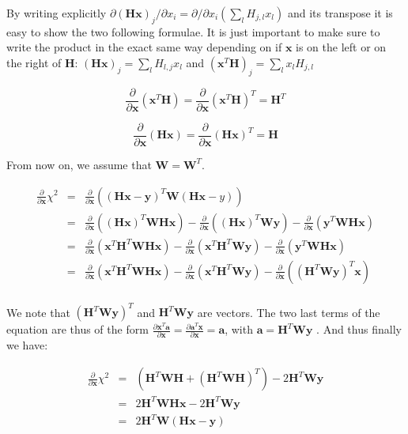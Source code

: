 \documentclass[12pt]{article}
\newcommand{\psf}{\mathbf{H}}
\newcommand{\x}{\mathbf{x}}
\newcommand{\y}{\mathbf{y}}
\newcommand{\W}{\mathbf{W}}
\newcommand{\ddx}{\frac{\partial}{\partial \mathbf{x}}}
\begin{document}
By writing explicitly $\partial (\psf \x)_{j} / \partial x_{i}
= \partial/\partial x_{i} \left( \sum_{l} H_{j,l} x_{l}\right)$ and its transpose
it is easy to show the two following formulae. It is just important to make sure
to write the product in the exact same way depending on if $\x$ is on the left
or on the right of $\psf$: $\left( \psf \x \right)_{j} =  \sum_{l} H_{l,j} x_{l}$
and $\left( \x^{T} \psf \right)_{j} =  \sum_{l} x_{l} H_{j,l}$

\begin{equation}
  \label{eq:3}
  \ddx \left( \x^{T} \psf \right) = \ddx \left( \x^{T} \psf \right)^{T} = \psf^{T}
\end{equation}

\begin{equation}
  \label{eq:4}
  \ddx \left( \psf \x \right) =  \ddx \left( \psf \x \right)^{T} = \psf
\end{equation}



From now on, we assume that $\W = \W^{T}$.

\begin{eqnarray*}
  \label{eq:5}
  \ddx \chi^{2} & = & \ddx \left( (\psf \x - \y)^{T} \W (\psf \x - y) \right)\\
                & = & \ddx \left( (\psf \x)^{T} \W \psf \x \right)  
                    - \ddx \left( (\psf \x)^{T} \W \y \right)
                    - \ddx \left( \y^{T} \W \psf \x \right) \\
                & = & \ddx \left( \x^{T} \psf^{T} \W \psf \x \right)
                    - \ddx \left( \x^{T} \psf^{T} \W \y \right)
                    - \ddx \left( \y^{T} \W \psf \x \right) \\
                & = & \ddx \left( \x^{T} \psf^{T} \W \psf \x \right)
                    - \ddx \left( \x^{T} \psf^{T} \W \y \right)
                    - \ddx \left( (\psf^{T} \W \y)^{T} \x \right) \\
\end{eqnarray*}

We note that $(\psf^{T} \W \y)^{T}$ and $\psf^{T} \W \y$ are vectors. The two
last terms of the equation are thus of the form $\frac{\partial \x^{T}
  \mathbf{a}}{\partial \x} = \frac{\partial \mathbf{a}^{T} \x}{\partial \x} =
\mathbf{a} $, with $\mathbf{a} = \psf^{T} \W \y$ . And thus finally we have:

\begin{eqnarray*}
  \label{eq:6}
  \ddx \chi^{2} & = & \left( \psf^{T} \W \psf + (\psf^{T} \W \psf)^{T} \right) 
                       - 2 \psf^{T} \W \y\\
                & = & 2 \psf^{T} \W \psf \x - 2 \psf^{T} \W \y \\
                & = & 2 \psf^{T} \W \left( \psf \x - \y \right) \\
\end{eqnarray*}
\end{document}
